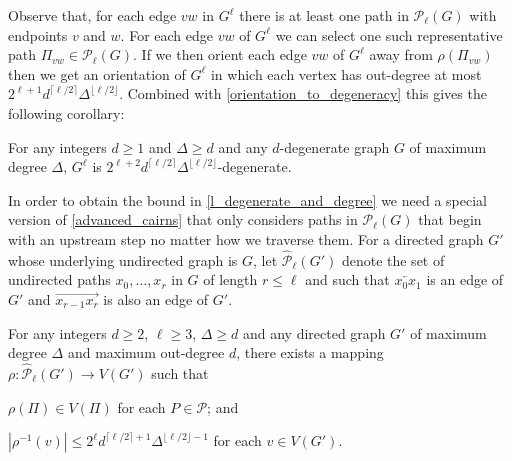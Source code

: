 \documentclass{patmorin}
\begin{document}
Observe that, for each edge $vw$ in $G^{\ell}$ there is at least one path in $\mathcal{P}_\ell(G)$ with endpoints $v$ and $w$.  For each edge $vw$ of $G^{\ell}$ we can select one such representative path $\Pi_{vw}\in\mathcal{P}_\ell(G)$.  If we then orient each edge $vw$ of $G^{\ell}$ away from $\rho(\Pi_{vw})$ then we get an orientation of $G^{\ell}$ in which each vertex has out-degree at most $2^{\ell+1}d^{\lceil \ell/2\rceil}\Delta^{\lfloor\ell/2\rfloor}$.  Combined with \cref{orientation_to_degeneracy} this gives the following corollary:

\begin{cor}\label{degeneracy_of_g_l}
  For any integers $d\ge 1$ and $\Delta\ge d$ and any $d$-degenerate graph $G$ of maximum degree $\Delta$, $G^{\ell}$ is $2^{\ell+2}d^{\lceil \ell/2\rceil}\Delta^{\lfloor\ell/2\rfloor}$-degenerate.
\end{cor}

In order to obtain the bound in \cref{l_degenerate_and_degree} we need a special version of \cref{advanced_cairns} that only considers paths in $\mathcal{P}_\ell(G)$ that begin with an upstream step no matter how we traverse them.  For a directed graph $G'$ whose underlying undirected graph is $G$, let $\widehat{\mathcal{P}}_\ell(G')$ denote the set of undirected paths $x_0,\ldots,x_r$ in $G$ of length $r\le\ell$ and such that $\overleftarrow{x_0x_1}$ is an edge of $G'$ and $\overrightarrow{x_{r-1}x_{r}}$ is also an edge of $G'$.

\begin{lem}\label{advanced_cairns2}
  For any integers $d\ge 2$, $\ell\ge 3$, $\Delta\ge d$ and any
  directed graph $G'$ of maximum degree $\Delta$ and maximum out-degree $d$, there exists a mapping $\rho:\widehat{\mathcal{P}}_\ell(G')\to V(G')$ such that
  \begin{compactenum}[(i)]
    \item $\rho(\Pi)\in V(\Pi)$ for each $P\in\mathcal{P}$; and
    \item $|\rho^{-1}(v)| \le 2^{\ell}d^{\lceil \ell/2\rceil+1}\Delta^{\lfloor\ell/2\rfloor-1}$ for each $v\in V(G')$.
  \end{compactenum}
\end{lem}
\end{document}
